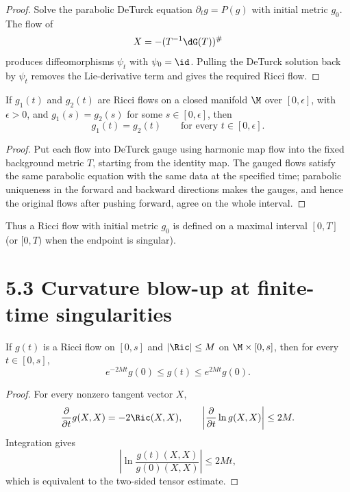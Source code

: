 \begin{proof}
\sketch Solve the parabolic DeTurck equation $\partial_tg=P(g)$ with
initial metric $g_0$. The flow of
\[
X=-(T^{-1}\dG(T))^\#
\]
produces diffeomorphisms $\psi_t$ with $\psi_0=\id$. Pulling the DeTurck
solution back by $\psi_t$ removes the Lie-derivative term and gives the
required Ricci flow.
\end{proof}

\begin{theorem}
\label{topping-ricci-flow-uniqueness}
If $g_1(t)$ and $g_2(t)$ are Ricci flows on a closed manifold $\M$ over
$[0,\epsilon]$, with $\epsilon>0$, and $g_1(s)=g_2(s)$ for some
$s\in[0,\epsilon]$, then
\[
g_1(t)=g_2(t)\qquad\text{for every }t\in[0,\epsilon].
\]
\end{theorem}

\begin{proof}
\sketch Put each flow into DeTurck gauge using harmonic map flow into the
fixed background metric $T$, starting from the identity map. The gauged flows
satisfy the same parabolic equation with the same data at the specified time;
parabolic uniqueness in the forward and backward directions makes the gauges,
and hence the original flows after pushing forward, agree on the whole
interval.
\end{proof}

Thus a Ricci flow with initial metric $g_0$ is defined on a maximal interval
$[0,T]$ (or $[0,T)$ when the endpoint is singular).

\section*{5.3 \quad Curvature blow-up at finite-time singularities}

\begin{lemma}
\label{topping-ricci-flow-metric-equivalence}
If $g(t)$ is a Ricci flow on $[0,s]$ and $|\Ric|\leq M$ on
$\M\times[0,s]$, then for every $t\in[0,s]$,
\[
e^{-2Mt}g(0)\leq g(t)\leq e^{2Mt}g(0).
\]
\end{lemma}

\begin{proof}
\sketch For every nonzero tangent vector $X$,
\[
\frac{\partial}{\partial t}g(X,X)=-2\Ric(X,X),
\qquad
\left|\frac{\partial}{\partial t}\ln g(X,X)\right|\leq 2M.
\]
Integration gives
\[
\left|\ln\frac{g(t)(X,X)}{g(0)(X,X)}\right|\leq 2Mt,
\]
which is equivalent to the two-sided tensor estimate.
\end{proof}

